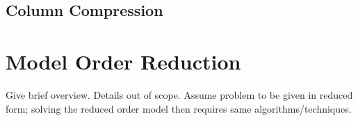 \subsection{Column Compression}

\section{Model Order Reduction}
Give brief overview.
Details out of scope.
Assume problem to be given in reduced form;
solving the reduced order model then requires same algorithms/techniques.
